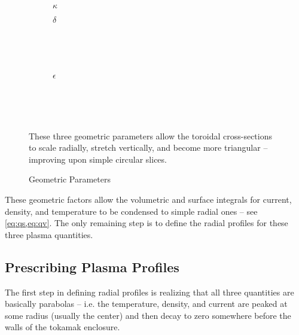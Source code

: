 \begin{figure*}[h]
    \centering
    \hfill 
    \begin{subfigure}[t]{0.45\textwidth}
        \centering
		\begin{adjustbox}{width=\textwidth}
			\Large
			
		\end{adjustbox}
        \caption{$\kappa$}
    \end{subfigure}
    \hfill
    \begin{subfigure}[t]{0.45\textwidth}
        \centering
		\begin{adjustbox}{width=\textwidth}
			\Large
			
		\end{adjustbox}
        \caption{$\delta$}
    \end{subfigure}
    \hfill \hfill ~\\ ~\\ ~\\
    \begin{subfigure}[t]{0.6\textwidth}
        \centering
		\begin{adjustbox}{width=\textwidth}
			\large
			
		\end{adjustbox}
        \caption{$\epsilon$}
    \end{subfigure} ~\\ ~\\
    \caption{Geometric Parameters} ~\\
    \small These three geometric parameters allow the toroidal cross-sections to scale radially, stretch vertically, and become more triangular -- improving upon simple circular slices.
    \label{fig:geometry}
\end{figure*}

These geometric factors allow the volumetric and surface integrals for current, density, and temperature to be condensed to simple radial ones -- see \cref{eq:qs,eq:qv}. The only remaining step is to define the radial profiles for these three plasma quantities.

\subsection{Prescribing Plasma Profiles}

The first step in defining radial profiles is realizing that all three quantities are basically parabolas -- i.e. the temperature, density, and current are peaked at some radius (usually the center) and then decay to zero somewhere before the walls of the tokamak enclosure.

